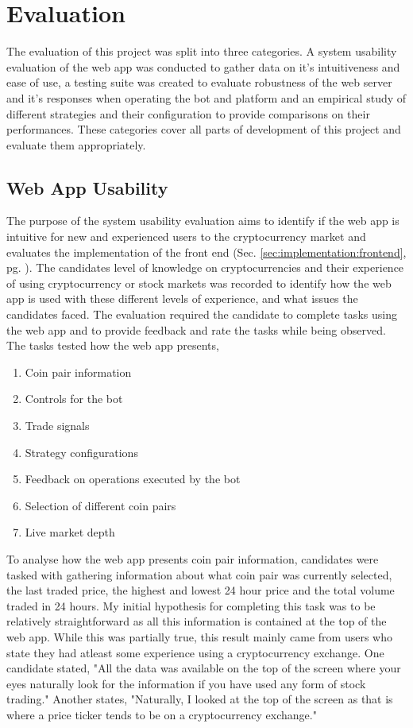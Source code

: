%
\chapter{Evaluation}
\label{sec:evaluation}

The evaluation of this project was split into three categories. A system usability evaluation of the web app was conducted to gather data on it's intuitiveness and ease of use, a testing suite was created to evaluate robustness of the web server and it's responses when operating the bot and platform and an empirical study of different strategies and their configuration to provide comparisons on their performances. These categories cover all parts of development of this project and evaluate them appropriately.


\section{Web App Usability}
\label{sec:evaluation:ui}
\noindent The purpose of the system usability evaluation aims to identify if the web app is intuitive for new and experienced users to the cryptocurrency market and evaluates the implementation of the front end (Sec. \ref{sec:implementation:frontend}, pg. \pageref{sec:implementation:frontend}). The candidates level of knowledge on cryptocurrencies and their experience of using cryptocurrency or stock markets was recorded to identify how the web app is used with these different levels of experience, and what issues the candidates faced. The evaluation required the candidate to complete tasks using the web app and to provide feedback and rate the tasks while being observed. The tasks tested how the web app presents,
\begin{enumerate}
\item Coin pair information
\item Controls for the bot
\item Trade signals 
\item Strategy configurations
\item Feedback on operations executed by the bot
\item Selection of different coin pairs
\item Live market depth
\end{enumerate}


\noindent To analyse how the web app presents coin pair information, candidates were tasked with gathering information about what coin pair was currently selected, the last traded price, the highest and lowest 24 hour price and the total volume traded in 24 hours. My initial hypothesis for completing this task was to be relatively straightforward as all this information is contained at the top of the web app. While this was partially true, this result mainly came from users who state they had atleast some experience using a cryptocurrency exchange. One candidate stated, "All the data was available on the top of the screen where your eyes naturally look for the information if you have used any form of stock trading." Another states, "Naturally, I looked at the top of the screen as that is where a price ticker tends to be on a cryptocurrency exchange."


